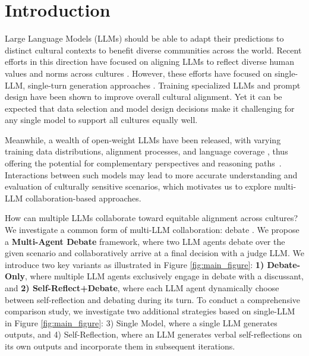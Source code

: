 \section{Introduction}




Large Language Models (LLMs) should be able to adapt their predictions to distinct cultural contexts to benefit diverse communities across the world. Recent efforts in this direction have focused on aligning LLMs to reflect diverse human values and norms across cultures \cite{modular, choenni-etal-2024-echoes, culturellm, selfalignment}. However, these efforts have focused on single-LLM, single-turn generation approaches \cite{cao-etal-2023-assessing, investigating, xu2024selfpluralisingculturealignmentlarge}. Training specialized LLMs \cite{culturellm} and prompt design \cite{shen-etal-2024-understanding} have been shown to improve overall cultural alignment. Yet it can be expected that data selection and model design decisions make it challenging for any single model to support all cultures equally well. 

Meanwhile, a wealth of open-weight LLMs have been released, with varying training data distributions, alignment processes, and language coverage \cite{yu2023kola, du2023improving, bansal2024llm}, thus offering the potential for complementary  perspectives and reasoning paths~\cite{farperspective, liang-etal-2024-encouraging}. Interactions between such models may lead to more accurate understanding and evaluation of culturally sensitive scenarios, which motivates us to explore multi-LLM collaboration-based approaches. 

How can multiple LLMs collaborate toward equitable alignment across cultures? We investigate a common form of multi-LLM collaboration: debate \cite{irving2018ai, khan2024debatingpersuasivellmsleads, kenton2024scalableoversightweakllms}. We propose a \textbf{Multi-Agent Debate} framework, where two LLM agents debate over the given scenario and collaboratively arrive at a final decision with a judge LLM. We introduce two key variants as illustrated in Figure \ref{fig:main_figure}: \textbf{1) Debate-Only}, where multiple LLM agents exclusively engage in debate with a discussant, and \textbf{2) Self-Reflect+Debate}, where each LLM agent dynamically choose between self-reflection and debating during its turn. To conduct a comprehensive comparison study, we investigate two additional strategies based on single-LLM in Figure \ref{fig:main_figure}: 3) Single Model, where a single LLM generates outputs, and 4) Self-Reflection, where an LLM generates verbal self-reflections on its own outputs and incorporate them in subsequent iterations.

